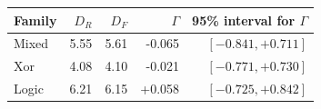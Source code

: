 \begin{tabular}{lrrrr}
\toprule
Family & $D_R$ & $D_F$ & $\Gamma$ & 95\% interval for $\Gamma$ \\
\midrule
Mixed & 5.55 & 5.61 & -0.065 & $[-0.841,+0.711]$ \\
Xor & 4.08 & 4.10 & -0.021 & $[-0.771,+0.730]$ \\
Logic & 6.21 & 6.15 & +0.058 & $[-0.725,+0.842]$ \\
\bottomrule
\end{tabular}
